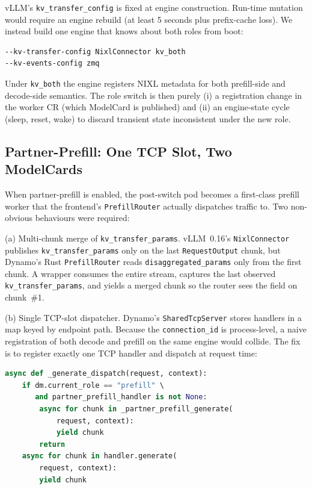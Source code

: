 \documentclass[10pt,twocolumn,letterpaper]{article}
\begin{document}
vLLM's \texttt{kv\_transfer\_config} is fixed at engine construction. Run-time mutation would require an engine rebuild (at least 5 seconds plus prefix-cache loss). We instead build one engine that knows about both roles from boot:

\begin{lstlisting}
--kv-transfer-config NixlConnector kv_both
--kv-events-config zmq
\end{lstlisting}

Under \texttt{kv\_both} the engine registers NIXL metadata for both prefill-side and decode-side semantics. The role switch is then purely (i) a registration change in the worker CR (which ModelCard is published) and (ii) an engine-state cycle (sleep, reset, wake) to discard transient state inconsistent under the new role.

\subsection{Partner-Prefill: One TCP Slot, Two ModelCards}
\label{sec:partner-prefill}

When partner-prefill is enabled, the post-switch pod becomes a first-class prefill worker that the frontend's \texttt{PrefillRouter} actually dispatches traffic to. Two non-obvious behaviours were required:

(a) Multi-chunk merge of \texttt{kv\_transfer\_params}. vLLM~0.16's \texttt{NixlConnector} publishes \texttt{kv\_transfer\_params} only on the last \texttt{RequestOutput} chunk, but Dynamo's Rust \texttt{PrefillRouter} reads \texttt{disaggregated\_params} only from the first chunk. A wrapper consumes the entire stream, captures the last observed \texttt{kv\_transfer\_params}, and yields a merged chunk so the router sees the field on chunk~\#1.

(b) Single TCP-slot dispatcher. Dynamo's \texttt{SharedTcpServer} stores handlers in a map keyed by endpoint path. Because the \texttt{connection\_id} is process-level, a naive registration of both decode and prefill on the same engine would collide. The fix is to register exactly one TCP handler and dispatch at request time:

\begin{lstlisting}[language=Python]
async def _generate_dispatch(request, context):
    if dm.current_role == "prefill" \
       and partner_prefill_handler is not None:
        async for chunk in _partner_prefill_generate(
            request, context):
            yield chunk
        return
    async for chunk in handler.generate(
        request, context):
        yield chunk
\end{lstlisting}
\end{document}
